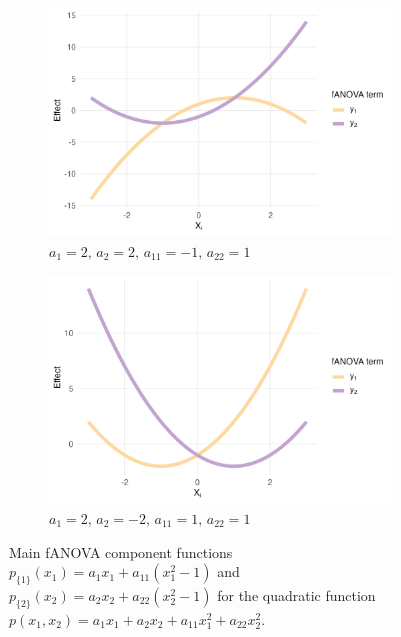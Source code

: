\begin{figure}[htpb]
    \begin{subfigure}[t]{0.49\textwidth}
        \centering
        \includegraphics[width=\textwidth]{images/experiment_section/mixed_a1p20_a2p20_a11m10_a22p10_a12p00_rhop00_main.png}
        \caption{$a_1=2,\, a_2=2,\, a_{11}=-1,\, a_{22}=1$}
        \label{fig:mixed_rho_0_panel3}
    \end{subfigure}%
    \hfill
    \begin{subfigure}[t]{0.49\textwidth}
        \centering
        \includegraphics[width=\textwidth]{images/experiment_section/mixed_a1p20_a2m20_a11p10_a22p10_a12p00_rhop00_main.png}
        \caption{$a_1=2,\, a_2=-2,\, a_{11}=1,\, a_{22}=1$}
        \label{fig:mixed_rho_0_panel4}
    \end{subfigure}

    \caption{Main fANOVA component functions $p_{\{1\}}(x_1) = a_1 x_1 + a_{11}(x_1^2 - 1)$ and $p_{\{2\}}(x_2) = a_2 x_2 + a_{22}(x_2^2 - 1)$ for the quadratic function $p(x_1, x_2) = a_1 x_1 + a_2 x_2 + a_{11} x_1^2 + a_{22} x_2^2$.}
    \label{fig:mixed_main_effects}
\end{figure}

